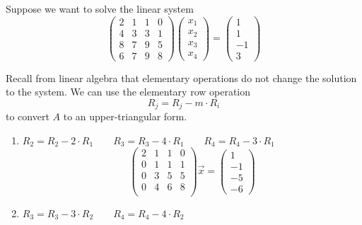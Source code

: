 \begin{example}
    Suppose we want to solve the linear system \[
        \begin{pmatrix}
            2 & 1 & 1 & 0 \\
            4 & 3 & 3 & 1 \\
            8 & 7 & 9 & 5 \\
            6 & 7 & 9 & 8
        \end{pmatrix}
        \begin{pmatrix}
            x_1 \\ x_2 \\ x_3 \\ x_4
        \end{pmatrix}
        =
        \begin{pmatrix}
            1 \\ 1 \\ -1 \\ 3
        \end{pmatrix}
    \]

    Recall from linear algebra that elementary operations do not change the solution to the system. We can use the elementary row operation \[
        R_j = R_j - m \cdot R_i
    \] to convert \( A \) to an upper-triangular form.

    \begin{enumerate}
        \item \( R_2 = R_2 - 2 \cdot R_1 \qquad R_3 = R_3 - 4 \cdot R_1 \qquad R_4 = R_4 - 3 \cdot R_1 \)
              \[
                  \begin{pmatrix}
                      2 & 1 & 1 & 0 \\
                      0 & 1 & 1 & 1 \\
                      0 & 3 & 5 & 5 \\
                      0 & 4 & 6 & 8 \\
                  \end{pmatrix}
                  \vec{x}
                  =
                  \begin{pmatrix}
                      1 \\ -1 \\ -5 \\ -6
                  \end{pmatrix}
              \]

        \item \( R_3 = R_3 - 3 \cdot R_2 \qquad R_4 = R_4 - 4 \cdot R_2 \)


\end{enumerate}
\end{example}
